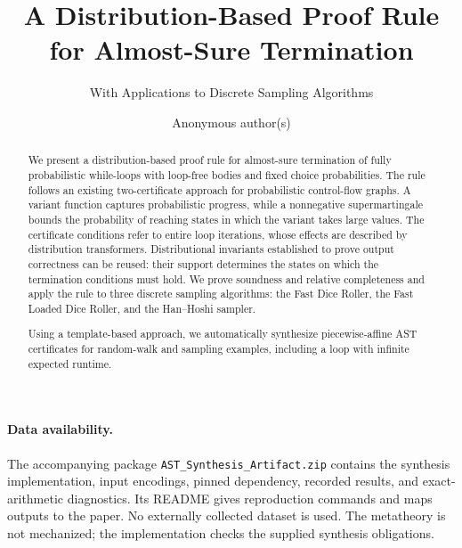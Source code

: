 \documentclass[runningheads]{llncs}
\begin{document}
\title{A Distribution-Based Proof Rule\\
for Almost-Sure Termination}
\subtitle{With Applications to Discrete Sampling Algorithms}

\author{Anonymous author(s)}
\institute{}

\maketitle

\begin{abstract}
We present a distribution-based proof rule for almost-sure termination
of fully probabilistic while-loops with loop-free bodies and fixed
choice probabilities. The rule follows an existing two-certificate
approach for probabilistic control-flow graphs. A variant function
captures probabilistic progress, while a nonnegative supermartingale
bounds the probability of reaching states in which the variant takes
large values. The certificate conditions refer to entire loop
iterations, whose effects are described by distribution transformers.
Distributional invariants established to prove output correctness
can be reused: their support determines the states on which the
termination conditions must hold. We prove soundness and relative
completeness and apply the rule to three discrete sampling algorithms:
the Fast Dice Roller, the Fast Loaded Dice Roller, and the Han--Hoshi
sampler.

Using a template-based approach, we automatically synthesize
piecewise-affine AST certificates for random-walk and sampling
examples, including a loop with infinite expected runtime.

\end{abstract}






\FloatBarrier




\paragraph{Data availability.}
The accompanying package \texttt{AST\_Synthesis\_Artifact.zip} contains the
synthesis implementation, input encodings, pinned dependency, recorded
results, and exact-arithmetic diagnostics. Its README gives reproduction
commands and maps outputs to the paper. No externally collected dataset
is used. The metatheory is not mechanized; the implementation checks the
supplied synthesis obligations.
\end{document}
